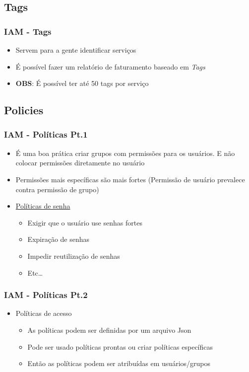 \subsection{Tags}

\begin{frame}
	\frametitle{IAM - Tags}
	\begin{itemize}
		\item Servem para a gente identificar serviços
		\item É possível fazer um relatório de faturamento baseado em \textit{Tags}
		\item \textbf{OBS}: É possível ter até 50 tags por serviço
	\end{itemize}
\end{frame}

\subsection{Policies}

\begin{frame}
	\frametitle{IAM - Políticas Pt.1}
	\begin{itemize}
		\item É uma boa prática criar grupos com permissões para os usuários. E não colocar permissões diretamente no usuário
		\item Permissões mais específicas são mais fortes (Permissão de usuário prevalece contra permissão de grupo)
		\item \href{https://docs.aws.amazon.com/pt_br/IAM/latest/UserGuide/id_credentials_passwords_account-policy.html}{Políticas de senha}
			\begin{itemize}
				\item Exigir que o usuário use senhas fortes
				\item Expiração de senhas
				\item Impedir reutilização de senhas
				\item Etc\dots
			\end{itemize}
	\end{itemize}
\end{frame}

\begin{frame}
	\frametitle{IAM - Políticas Pt.2}
	\begin{itemize}
		\item Políticas de acesso
			\begin{itemize}
				\item As políticas podem ser definidas por um arquivo Json
				\item Pode ser usado políticas prontas ou criar políticas específicas
				\item Então as políticas podem ser atribuídas em usuários/grupos
			\end{itemize}
	\end{itemize}
\end{frame}

